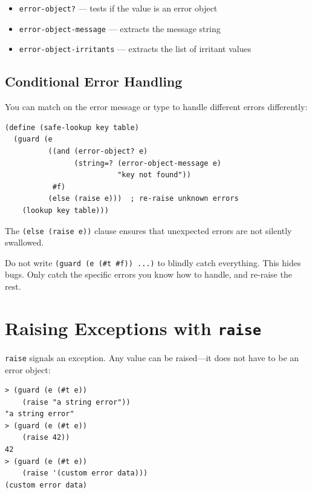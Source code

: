\begin{itemize}
    \item \texttt{error-object?} --- tests if the value is an error object
    \item \texttt{error-object-message} --- extracts the message string
    \item \texttt{error-object-irritants} --- extracts the list of irritant values
\end{itemize}

\subsection{Conditional Error Handling}

You can match on the error message or type to handle different errors differently:

\begin{lstlisting}
(define (safe-lookup key table)
  (guard (e
          ((and (error-object? e)
                (string=? (error-object-message e)
                          "key not found"))
           #f)
          (else (raise e)))  ; re-raise unknown errors
    (lookup key table)))
\end{lstlisting}

The \texttt{(else (raise e))} clause ensures that unexpected errors are not silently swallowed.

\begin{warning}
Do not write \texttt{(guard (e (\#t \#f)) ...)} to blindly catch everything. This hides bugs. Only catch the specific errors you know how to handle, and re-raise the rest.
\end{warning}

\section{Raising Exceptions with \texttt{raise}}

\texttt{raise} signals an exception. Any value can be raised---it does not have to be an error object:

\begin{lstlisting}[style=repl]
> (guard (e (#t e))
    (raise "a string error"))
"a string error"
> (guard (e (#t e))
    (raise 42))
42
> (guard (e (#t e))
    (raise '(custom error data)))
(custom error data)
\end{lstlisting}

